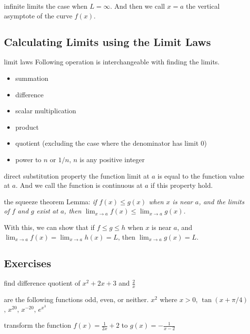 \documentclass[Calculus 1 Recitation.tex]{subfiles}
\begin{document}
\begin{myleftlinebox}
	infinite limits
	\tcblower
	the case when $L=\infty$. And then we call $x=a$ the vertical asymptote of the curve $f(x)$.
\end{myleftlinebox}


\subsection{Calculating Limits using the Limit Laws}


\begin{myleftlinebox}
	limit laws
	\tcblower
	Following operation is interchangeable with finding the limits.
	\begin{itemize}
		\item summation
		\item difference
		\item scalar multiplication
		\item product
		\item quotient (excluding the case where the denominator has limit $0$)
		\item power to $n$ or $1/n$, $n$ is any positive integer
	\end{itemize}
\end{myleftlinebox}

\begin{myleftlinebox}
	direct substitution property
	\tcblower
	the function limit at $a$ is equal to the function value at $a$. And we call the function is continuous at $a$ if this property hold.
\end{myleftlinebox}

\begin{myleftlinebox}
	the squeeze theorem
	\tcblower
	Lemma: \emph{if $f(x)\leq g(x)$ when $x$ is near $a$, and the limits of $f$ and $g$ exist at $a$, then $\lim_{x\to a} f(x)\leq \lim_{x\to a} g(x)$.}

	With this, we can show that if $f\leq g\leq h$ when $x$ is near $a$, and $\lim_{x\to a} f(x) = \lim_{x\to a} h(x)=L$, then $\lim_{x\to a} g(x)=L$.
\end{myleftlinebox}

\subsection{Exercises}

\begin{myleftlinebox}
	find difference quotient of \(x^2+2x+3\) and \(\frac{2}{x}\)
	\tcblower
	\vspace{2em}
\end{myleftlinebox}

\begin{myleftlinebox}
	are the following functions odd, even, or neither. \(x^2\) where \(x>0\), \(\tan(x+\pi/4)\), \(x^{20}\), \(x^{-20}\), \(e^{x^3}\)
	\tcblower
	\vspace{5em}
\end{myleftlinebox}

\begin{myleftlinebox}
	transform the function $f(x)=\frac{1}{2x}+2$ to $g(x)=-\frac{1}{x-2}$
	\tcblower
	\vspace{2em}
\end{myleftlinebox}
\end{document}
